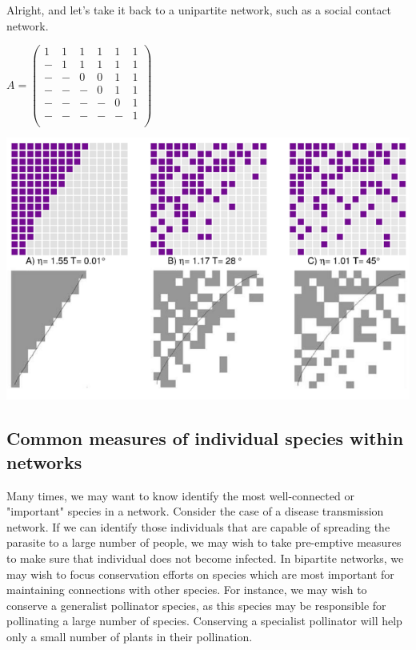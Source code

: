 \documentclass[12pt]{article}
\begin{document}
Alright, and let's take it back to a unipartite network, such as a social contact network.

$A = \begin{pmatrix}
    1&1&1&1&1&1\\
    -&1&1&1&1&1\\
    -&-&0&0&1&1\\
    -&-&-&0&1&1\\
    -&-&-&-&0&1\\
    -&-&-&-&-&1\\
\end{pmatrix}$



\includegraphics[width=\textwidth]{figs/nestednes.png}


















\bigskip

\subsection*{Common measures of individual species within networks}

Many times, we may want to know identify the most well-connected or "important" species in a network. Consider the case of a disease transmission network. If we can identify those individuals that are capable of spreading the parasite to a large number of people, we may wish to take pre-emptive measures to make sure that individual does not become infected. In bipartite networks, we may wish to focus conservation efforts on species which are most important for maintaining connections with other species. For instance, we may wish to conserve a generalist pollinator species, as this species may be responsible for pollinating a large number of species. Conserving a specialist pollinator will help only a small number of plants in their pollination. 
\end{document}
